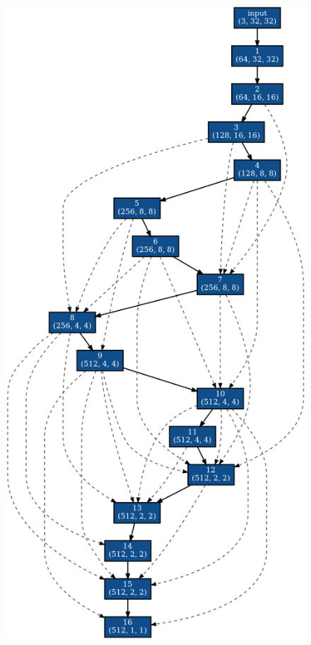 \begin{figure}[tb]
 \begin{minipage}{0.5\hsize}
 	\begin{center}
    \includegraphics[clip,scale=0.2]{./fig/04.exp/normal_last.png}\\

\end{center}
\end{minipage}
\end{figure}

